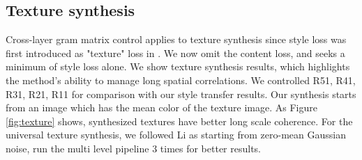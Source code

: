 \documentclass[runningheads]{llncs}
\begin{document}
\subsection{Texture synthesis} 
Cross-layer gram matrix control applies to texture synthesis since style loss \cite{gatys2016image} was first introduced as "texture" loss in \cite{NIPS2015_5633}.  We now omit the content loss, and seeks a minimum of style loss alone.  We show texture synthesis results, which highlights the method's ability to manage long spatial correlations.  We controlled R51, R41, R31, R21, R11 for comparison with our style transfer results.  Our synthesis starts from an image which has the mean color of the texture image. %
As Figure \ref{fig:texture} shows, synthesized textures have better long scale coherence.    For the universal texture synthesis, we followed Li \ea  as starting from zero-mean Gaussian noise, run the multi level pipeline 3 times for better results.
\end{document}
